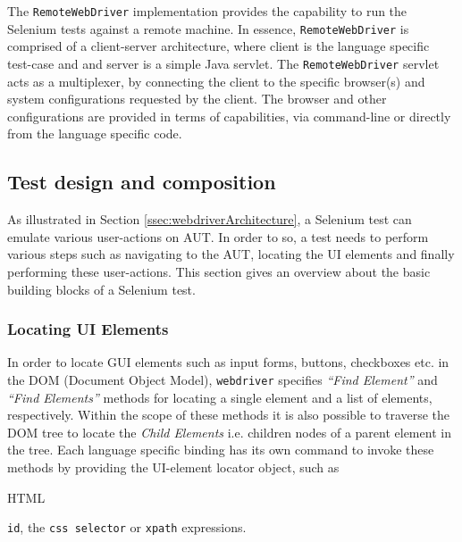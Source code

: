 The \texttt{RemoteWebDriver} implementation provides the capability to run the Selenium tests against a remote machine. In essence, \texttt{RemoteWebDriver} is comprised of a client-server architecture, where client is the language specific test-case and and server is a simple Java servlet. The \texttt{RemoteWebDriver} servlet acts as a multiplexer, by connecting the client to the specific browser(s) and system configurations requested by the client. The browser and other configurations are provided in terms of capabilities, via command-line or directly from the language specific code.
\subsection{Test design and composition}
\label{testDesignPractices}
As illustrated in Section \ref{ssec:webdriverArchitecture}, a Selenium test can emulate various user-actions on AUT. In order to so, a test needs to perform various steps such as navigating to the AUT, locating the UI elements and finally performing these user-actions. This section gives an overview about the basic building blocks of a Selenium test. 
\subsubsection{Locating UI Elements}
\label{sssec:locatingUIElements}
In order to locate GUI elements such as input forms, buttons, checkboxes etc. in the DOM (Document Object Model), \texttt{webdriver} specifies \textit{``Find Element''} and \textit{``Find Elements''} methods for locating a single element and a list of elements, respectively. 
Within the scope of these methods it is also possible to traverse the DOM tree to locate the \textit{Child Elements} i.e. children nodes of a parent element in the tree. 
Each language specific binding has its own command to invoke these methods by providing the UI-element locator object, such as\begin{small} HTML\end{small} \texttt{id}, the \texttt{css selector} or \texttt{xpath} expressions.



